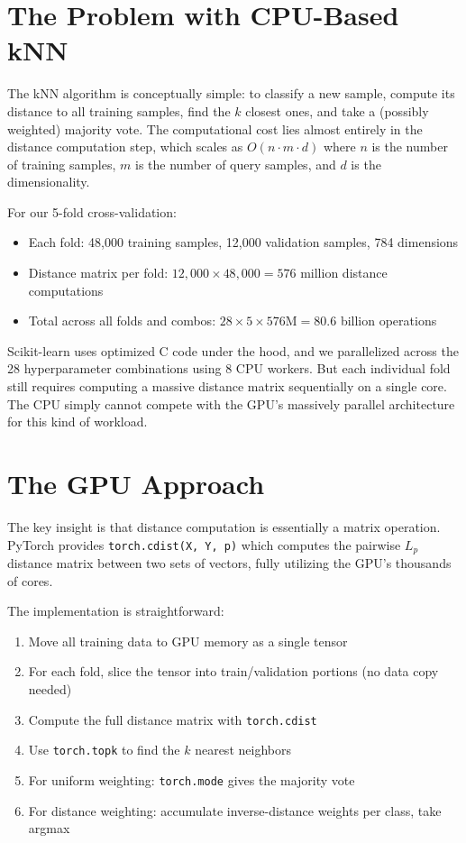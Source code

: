 \documentclass[11pt]{article}
\begin{document}
\section{The Problem with CPU-Based kNN}

The kNN algorithm is conceptually simple: to classify a new sample, compute its distance to all training samples, find the $k$ closest ones, and take a (possibly weighted) majority vote. The computational cost lies almost entirely in the distance computation step, which scales as $O(n \cdot m \cdot d)$ where $n$ is the number of training samples, $m$ is the number of query samples, and $d$ is the dimensionality.

For our 5-fold cross-validation:
\begin{itemize}[nosep]
	\item Each fold: 48,000 training samples, 12,000 validation samples, 784 dimensions
	\item Distance matrix per fold: $12{,}000 \times 48{,}000 = 576$ million distance computations
	\item Total across all folds and combos: $28 \times 5 \times 576\text{M} = 80.6$ billion operations
\end{itemize}

Scikit-learn uses optimized C code under the hood, and we parallelized across the 28 hyperparameter combinations using 8 CPU workers. But each individual fold still requires computing a massive distance matrix sequentially on a single core. The CPU simply cannot compete with the GPU's massively parallel architecture for this kind of workload.

\section{The GPU Approach}

The key insight is that distance computation is essentially a matrix operation. PyTorch provides \texttt{torch.cdist(X, Y, p)} which computes the pairwise $L_p$ distance matrix between two sets of vectors, fully utilizing the GPU's thousands of cores.

The implementation is straightforward:

\begin{enumerate}[nosep]
	\item Move all training data to GPU memory as a single tensor
	\item For each fold, slice the tensor into train/validation portions (no data copy needed)
	\item Compute the full distance matrix with \texttt{torch.cdist}
	\item Use \texttt{torch.topk} to find the $k$ nearest neighbors
	\item For uniform weighting: \texttt{torch.mode} gives the majority vote
	\item For distance weighting: accumulate inverse-distance weights per class, take argmax
\end{enumerate}
\end{document}
